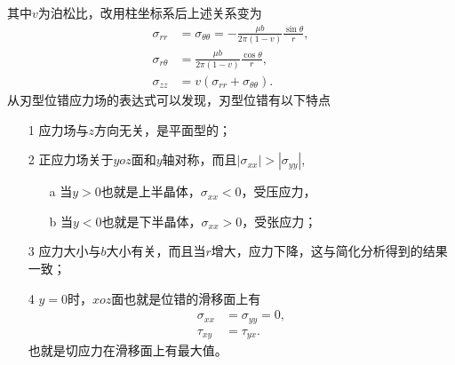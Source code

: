                 其中$v$为泊松比，改用柱坐标系后上述关系变为
                \begin{align}
                    \sigma_{r r}&=\sigma_{\theta \theta}=-\frac{\mu b}{2 \pi(1-v)} \frac{\sin \theta}{r}, \\ 
                    \sigma_{r \theta}&=\frac{\mu b}{2 \pi(1-v)} \frac{\cos \theta}{r}, \\ 
                    \sigma_{z z}&=v\left(\sigma_{r r}+\sigma_{\theta \theta}\right).
                \end{align}
                从刃型位错应力场的表达式可以发现，刃型位错有以下特点
                \begin{enumerate}
                    \item[1] 应力场与$z$方向无关，是平面型的；
                    \item[2] 正应力场关于$yoz$面和$y$轴对称，而且$|\sigma_{xx}|>|\sigma_{yy}|$,
                    \begin{enumerate}
                        \item[a] 当$y>0$也就是上半晶体，$\sigma_{xx}<0$，受压应力，
                        \item[b] 当$y<0$也就是下半晶体，$\sigma_{xx}>0$，受张应力；
                    \end{enumerate} 
                    \item[3] 应力大小与$b$大小有关，而且当$r$增大，应力下降，这与简化分析得到的结果一致；
                    \item[4] $y=0$时，$xoz$面也就是位错的滑移面上有
                            \begin{align}
                                \sigma_{xx}&=\sigma_{yy}=0,\\
                                \tau_{xy}&=\tau_{yx}.
                            \end{align} 
                            也就是切应力在滑移面上有最大值。
                \end{enumerate}
